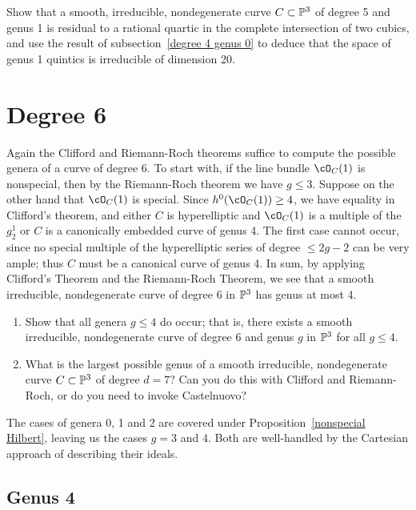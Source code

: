 \begin{exercise}
Show that a smooth, irreducible, nondegenerate curve $C \subset \PP^3$ of degree 5 and genus 1 is residual to a rational quartic in the complete intersection of two cubics, and use the result of subsection~\ref{degree 4 genus 0} to deduce that the space of genus 1 quintics is irreducible of dimension 20.
\end{exercise}

\section{Degree 6}

Again the Clifford and Riemann-Roch theorems suffice to compute the possible genera of a curve of degree 6. To start with,  if the line bundle $\cO_C(1)$ is nonspecial, then by the Riemann-Roch theorem we have $g \leq 3$. Suppose on the other hand that $\cO_C(1)$ is special. Since   $h^{0}(\cO_C(1)) \geq 4$, we have equality in Clifford's theorem, and either $C$ is hyperelliptic and $\cO_C(1)$ is a multiple of the $g^{1}_{2}$ or  $C$ is  a canonically embedded curve of genus 4. The first case cannot occur, since no special multiple of the hyperelliptic series of degree $\leq 2g-2$ can be very ample; thus $C$ must be a canonical curve of genus 4. In sum, by applying Clifford's Theorem and the Riemann-Roch Theorem, we see that a smooth irreducible, nondegenerate curve of degree 6 in $\PP^3$ has genus at most 4.

\begin{exercise}
\begin{enumerate}
\item Show that all genera $g \leq 4$ do occur; that is, there exists a smooth irreducible, nondegenerate curve of degree 6 and genus $g$ in $\PP^3$ for all $g \leq 4$.
\item What is the largest possible genus of a smooth irreducible, nondegenerate curve $C \subset \PP^3$ of degree $d=7$? Can you do this with Clifford and Riemann-Roch, or do you need to invoke Castelnuovo?
\end{enumerate}
\end{exercise}

The cases of genera 0, 1 and 2 are covered under Proposition~\ref{nonspecial Hilbert}, leaving us the cases $g = 3$ and 4. Both are well-handled by the Cartesian approach of describing their ideals.

\subsection{Genus 4}

